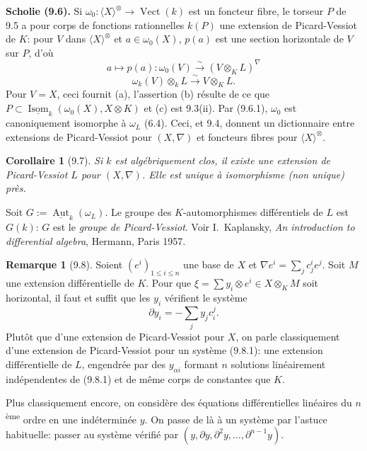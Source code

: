 \documentclass[12pt,a4paper]{article}
\theoremstyle{plain}
\newtheorem{corollary}[theorem]{Corollaire}
\theoremstyle{definition}
\newtheorem{remark}[theorem]{Remarque}
\DeclareMathOperator{\Aut}{Aut}
\DeclareMathOperator{\Isom}{Isom}
\DeclareMathOperator{\Vect}{Vect}
\begin{document}
\textbf{Scholie (9.6).} Si $\omega_0 : \langle X \rangle^\otimes \to \Vect(k)$ est un foncteur fibre, le torseur $P$ de 9.5 a pour corps de fonctions rationnelles $k(P)$ une extension de Picard-Vessiot de $K$: pour $V$ dans $\langle X \rangle^\otimes$ et $a \in \omega_0(X)$, $p(a)$ est une section horizontale de $V$ sur $P$, d'où
\begin{equation}\label{eq:9.6.1}
a \mapsto p(a) : \omega_0(V) \xrightarrow{\sim} (V \otimes_K L)^\nabla
\end{equation}
\begin{equation}\label{eq:9.6.2}
\omega_k(V) \otimes_k L \xrightarrow{\sim} V \otimes_K L.
\end{equation}
Pour $V = X$, ceci fournit (a), l'assertion (b) résulte de ce que $P \subset \underline{\Isom}_k(\omega_0(X), X \otimes K)$ et (c) est 9.3(ii). Par (9.6.1), $\omega_0$ est canoniquement isomorphe à $\omega_L$ (6.4). Ceci, et 9.4, donnent un dictionnaire entre extensions de Picard-Vessiot pour $(X, \nabla)$ et foncteurs fibres pour $\langle X \rangle^\otimes$.

\begin{corollary}[9.7]
Si $k$ est algébriquement clos, il existe une extension de Picard-Vessiot $L$ pour $(X, \nabla)$. Elle est unique à isomorphisme (non unique) près.
\end{corollary}

Soit $G := \underline{\Aut}_k(\omega_L)$. Le groupe des $K$-automorphismes différentiels de $L$ est $G(k)$: $G$ est le \emph{groupe de Picard-Vessiot}. Voir I.~Kaplansky, \textit{An introduction to differential algebra}, Hermann, Paris 1957.

\begin{remark}[9.8]
Soient $(e^i)_{1 \leq i \leq n}$ une base de $X$ et $\nabla e^i = \sum_j c^i_j e^j$. Soit $M$ une extension différentielle de $K$. Pour que $\xi = \sum y_i \otimes e^i \in X \otimes_K M$ soit horizontal, il faut et suffit que les $y_i$ vérifient le système
\begin{equation}\label{eq:9.8.1}
\partial y_i = -\sum_j y_j c^j_i.
\end{equation}
Plutôt que d'une extension de Picard-Vessiot pour $X$, on parle classiquement d'une extension de Picard-Vessiot pour un système (9.8.1): une extension différentielle de $L$, engendrée par des $y_{\alpha i}$ formant $n$ solutions linéairement indépendentes de (9.8.1) et de même corps de constantes que $K$.

Plus classiquement encore, on considère des équations différentielles linéaires du $n$\textsuperscript{ème} ordre en une indéterminée $y$. On passe de là à un système par l'astuce habituelle: passer au système vérifié par $(y, \partial y, \partial^2 y, \ldots, \partial^{n-1}y)$.
\end{remark}
\end{document}
